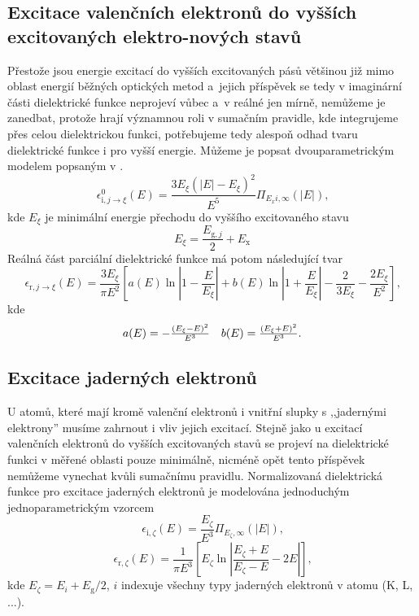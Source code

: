 \subsection{Excitace valenčních elektronů do vyšších excitovaných elektro-nových stavů}
Přestože jsou energie excitací do vyšších excitovaných pásů většinou již mimo oblast energií běžných optických metod a~jejich příspěvek se tedy v imaginární části dielektrické funkce neprojeví vůbec a~v reálné jen mírně, nemůžeme je zanedbat, protože hrají významnou roli v sumačním pravidle, kde integrujeme přes celou dielektrickou funkci, potřebujeme tedy alespoň odhad tvaru dielektrické funkce i pro vyšší energie. 
Můžeme je popsat dvouparametrickým modelem popsaným v \cite{sumrule}.
\begin{equation}
\label{vyssiexcitace}
\epsilon_{\mathrm{i}, j \rightarrow \xi}^0(E) = \frac{3 E_\xi(|E| - E_\xi)^2}{E^5} \Pi_{E_xi, \infty}(|E|) \text{,}
\end{equation}
kde $E_\xi$ je minimální energie přechodu do vyššího excitovaného stavu
\begin{equation}
E_\xi = \frac{E_{\mathrm{g},j}}{2} + E_\mathrm{x}
\end{equation}
Reálná část parciální dielektrické funkce má potom následující tvar
\begin{equation}
\epsilon_{\mathrm{r}, j \rightarrow \xi}(E) = 
\frac{3E_\xi}{\pi E^2}
\left[
	a(E) \ln\left|1-\frac{E}{E_\xi}\right|
	+ b(E) \ln\left|1 + \frac{E}{E_\xi}\right|
	- \frac{2}{3E_\xi} - \frac{2E_\xi}{E^2}
\right] \text{,}
\end{equation}
kde
\begin{equation}
\begin{array}{c c}
a(E) = -\frac{(E_\xi - E)^2}{E^3} &
b(E) = \frac{(E_\xi + E)^2}{E^3} \text{.}\\
\end{array}
\end{equation}


\subsection{Excitace jaderných elektronů}
U atomů, které mají kromě valenční elektronů i vnitřní slupky s ,,jadernými elektrony'' musíme zahrnout i vliv jejich excitací. Stejně jako u excitací valenčních elektronů do vyšších excitovaných stavů se projeví na dielektrické funkci v měřené oblasti pouze minimálně, nicméně opět tento příspěvek nemůžeme vynechat kvůli sumačnímu pravidlu. Normalizovaná dielektrická funkce pro excitace jaderných elektronů je modelována jednoduchým jednoparametrickým vzorcem \cite{sumrule2}
\begin{equation}
\label{jaderneel}
\epsilon_{\mathrm{i},\zeta}(E) = \frac{E_\zeta}{E^3} \Pi_{E_\zeta,\infty}(|E|) \text{,}
\end{equation}
\begin{equation}
\epsilon_{\mathrm{r},\zeta}(E) = \frac{1}{\pi E^3}\left[ E_\zeta \ln\left| \frac{E_\zeta + E}{E_\zeta - E} - 2E\right| \right] \text{,}
\end{equation}
kde $E_\zeta = E_i + E_\mathrm{g}/2$, $i$ indexuje všechny typy jaderných elektronů v atomu (K, L, ...). 


